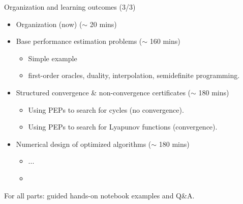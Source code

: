 \documentclass[aspectratio=169]{beamer}
\begin{document}
\begin{frame}{Organization and learning outcomes (3/3)}
\begin{itemize}
    \item[0.] Organization (now) \hfill ($\sim$ 20 mins)
    \item[1.] Base performance estimation problems \hfill ($\sim$ 160 mins)
    \begin{itemize}
    	\item Simple example
    	\item first-order oracles, duality, interpolation, semidefinite programming.
    \end{itemize}
    \item[2.] Structured convergence \& non-convergence certificates \hfill ($\sim$ 180 mins)
    \begin{itemize}
        \item Using PEPs to search for cycles (no convergence).
        \item Using PEPs to search for Lyapunov functions (convergence).
    \end{itemize}
    \item[3.] Numerical design of optimized algorithms \hfill ($\sim$ 180 mins)
    \begin{itemize}
    	\item ...
    	\item  
    \end{itemize}
\end{itemize}
For all parts: guided hands-on notebook examples and Q\&A.
\end{frame}
\end{document}
